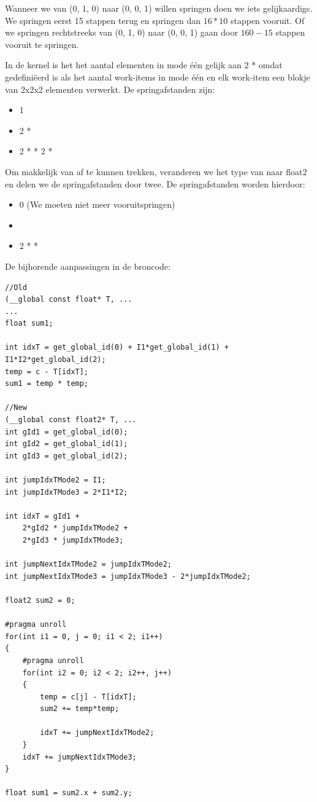 Wanneer we van (0, 1, 0) naar (0, 0, 1) willen springen doen we iets gelijkaardigs. We springen eerst 15 stappen terug en springen dan $16 * 10$ stappen vooruit. Of we springen rechtstreeks van (0, 1, 0) naar (0, 0, 1) gaan door $160 - 15$ stappen vooruit te springen.

In de kernel is het het aantal elementen in mode \'e\'en gelijk aan 2 *  omdat  gedefini\"eerd is als het aantal work-items in mode \'e\'en en elk work-item een blokje van 2x2x2 elementen verwerkt. De springafstanden zijn:
\begin{itemize}
    \item 1
    \item 2 * 
    \item 2 *  * 2 * 
\end{itemize}
Om \TT makkelijk van \CC af te kunnen trekken, veranderen we het type van \TT naar float2 en delen we de springafstanden door twee. De springafstanden worden hierdoor:
\begin{itemize}
	\item 0 (We moeten niet meer vooruitspringen)
    \item {}
    \item 2 *  * 
\end{itemize}

De bijhorende aanpassingen in de broncode:
\begin{lstlisting}
//Old
(__global const float* T, ...
...
float sum1;

int idxT = get_global_id(0) + I1*get_global_id(1) + I1*I2*get_global_id(2);
temp = c - T[idxT];
sum1 = temp * temp;

//New
(__global const float2* T, ...
int gId1 = get_global_id(0);
int gId2 = get_global_id(1);
int gId3 = get_global_id(2);

int jumpIdxTMode2 = I1;
int jumpIdxTMode3 = 2*I1*I2;

int idxT = gId1 + 
	2*gId2 * jumpIdxTMode2 +
	2*gId3 * jumpIdxTMode3;

int jumpNextIdxTMode2 = jumpIdxTMode2;
int jumpNextIdxTMode3 = jumpIdxTMode3 - 2*jumpIdxTMode2;

float2 sum2 = 0;

#pragma unroll
for(int i1 = 0, j = 0; i1 < 2; i1++)
{
	#pragma unroll
	for(int i2 = 0; i2 < 2; i2++, j++)
	{
		temp = c[j] - T[idxT];
		sum2 += temp*temp;
		
		idxT += jumpNextIdxTMode2;
	}
	idxT += jumpNextIdxTMode3;
}

float sum1 = sum2.x + sum2.y;
\end{lstlisting}

